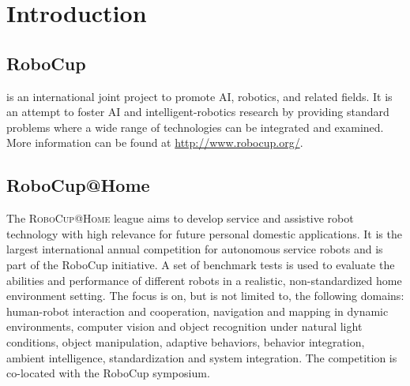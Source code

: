\chapter{Introduction}
\label{chap:introduction}


\section{RoboCup}

\RoboCup{} is an international joint project to promote AI, robotics, and related fields.
It is an attempt to foster AI and intelligent-robotics research by providing standard problems where a wide range of technologies can be integrated and examined. More information can be found at \url{http://www.robocup.org/}.

\section{RoboCup@Home}

The \textsc{RoboCup@Home} league aims to develop service and assistive robot technology with high relevance for future personal domestic applications.
It is the largest international annual competition for autonomous service robots and is part of the RoboCup initiative.
A set of benchmark tests is used to evaluate the abilities and performance of different robots in a realistic, non-standardized home environment setting.
The focus is on, but is not limited to, the following domains: human-robot interaction and cooperation, navigation and mapping in dynamic environments, computer vision and object recognition under natural light conditions, object manipulation, adaptive behaviors, behavior integration, ambient intelligence, standardization and system integration.
The competition is co-located with the RoboCup symposium.

%

%

%



%

